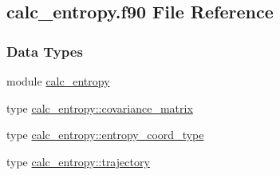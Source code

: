 \hypertarget{calc__entropy_8f90}{\subsection{calc\-\_\-entropy.\-f90 File Reference}
\label{calc__entropy_8f90}
}
\subsubsection*{Data Types}
\begin{DoxyCompactItemize}
\item 
module \hyperlink{classcalc__entropy}{calc\-\_\-entropy}
\item 
type \hyperlink{structcalc__entropy_1_1covariance__matrix}{calc\-\_\-entropy\-::covariance\-\_\-matrix}
\item 
type \hyperlink{structcalc__entropy_1_1entropy__coord__type}{calc\-\_\-entropy\-::entropy\-\_\-coord\-\_\-type}
\item 
type \hyperlink{structcalc__entropy_1_1trajectory}{calc\-\_\-entropy\-::trajectory}
\end{DoxyCompactItemize}
